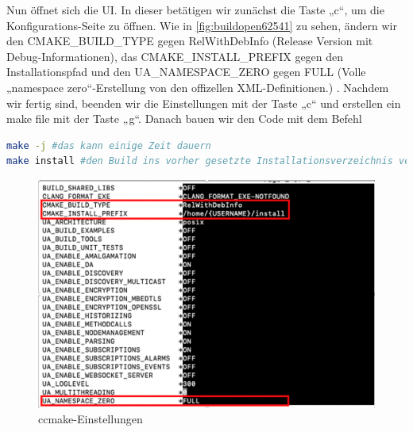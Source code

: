 Nun öffnet sich die UI. In dieser betätigen wir zunächst die Taste „c“, um die Konfigurations-Seite zu öffnen. Wie in \autoref{fig:buildopen62541} zu sehen, ändern wir den CMAKE\_BUILD\_TYPE gegen RelWithDebInfo (Release Version mit Debug-Informationen), das CMAKE\_INSTALL\_PREFIX gegen den Installationspfad und den UA\_NAMESPACE\_ZERO gegen FULL (Volle „namespace zero“-Erstellung von den offizellen XML-Definitionen.) . Nachdem wir fertig sind, beenden wir die Einstellungen mit der Taste „c“ und erstellen ein make file mit der Taste „g“.
Danach bauen wir den Code mit dem Befehl
\begin{lstlisting}[language=Bash]
make -j #das kann einige Zeit dauern
make install #den Build ins vorher gesetzte Installationsverzeichnis verschieben
\end{lstlisting}


  
\begin{figure}[H]
	\centering
	\includegraphics[width=0.6\linewidth]{abb/Build_Open62541}
	\caption{ccmake-Einstellungen}
	\label{fig:buildopen62541}
\end{figure}

